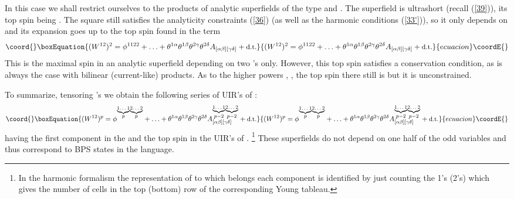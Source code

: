 \documentclass[a4paper,12pt]{article}
\begin{document}
In this case we shall restrict ourselves to the products of 
analytic superfields of the type \coordHE{} and \coordHE{}. The 
superfield \coordHE{} is ultrashort (recall (\ref{39})), its top 
spin being \coordHE{}. The square \coordHE{} still satisfies the 
analyticity constraints (\ref{36}) (as well as the harmonic 
conditions (\ref{33'})), so it only depends on 
\coordHE{} and its expansion goes up to the top spin 
\coordHE{} found in the term 
\begin{equation}\coord{}\boxEquation{\label{56}
 (W^{12})^2 = \phi^{1122} + \ldots 
+ \theta^{1\alpha}\theta^{1\beta}\theta^{2\gamma}\theta^{2\delta} 
A_{[\alpha\beta][\gamma\delta]} + \mbox{\small d.t.} 
}{(W^{12})^2 = \phi^{1122} + \ldots 
+ \theta^{1\alpha}\theta^{1\beta}\theta^{2\gamma}\theta^{2\delta} 
A_{[\alpha\beta][\gamma\delta]} + \mbox{\small d.t.} 
}{ecuacion}\coordE{}\end{equation}
This is the maximal spin in an analytic \coordHE{} superfield 
depending on two \myHighlight{$\theta$}\coordHE{}'s only. However, this top spin satisfies 
a conservation condition, as is always the case with bilinear 
(current-like) products. As to the higher powers \coordHE{}, 
\coordHE{}, the top spin there still is \coordHE{} but it is 
unconstrained. 

To summarize, tensoring \coordHE{}'s we obtain the following series 
of UIR's of \coordHE{}:
\begin{equation}\coord{}\boxEquation{\label{series1}
  (W^{12})^p = \phi^{\stackrel{\underbrace{\mbox{\scriptsize 1\ldots 1}}}{p}
\stackrel{\underbrace{\mbox{\scriptsize 2\ldots 2}}}{p}} + \ldots 
+  \theta^{1\alpha}\theta^{1\beta}\theta^{2\gamma}\theta^{2\delta} 
A^{\stackrel{\underbrace{\mbox{\scriptsize 1\ldots 1}}}{p-2} 
\stackrel{\underbrace{\mbox{\scriptsize 2\ldots 
2}}}{p-2}}_{[\alpha\beta][\gamma\delta]} + \mbox{\small d.t.} 
}{(W^{12})^p = \phi^{\stackrel{\underbrace{\mbox{\scriptsize 1\ldots 1}}}{p}
\stackrel{\underbrace{\mbox{\scriptsize 2\ldots 2}}}{p}} + \ldots 
+  \theta^{1\alpha}\theta^{1\beta}\theta^{2\gamma}\theta^{2\delta} 
A^{\stackrel{\underbrace{\mbox{\scriptsize 1\ldots 1}}}{p-2} 
\stackrel{\underbrace{\mbox{\scriptsize 2\ldots 
2}}}{p-2}}_{[\alpha\beta][\gamma\delta]} + \mbox{\small d.t.} 
}{ecuacion}\coordE{}\end{equation}
having the first component in the \coordHE{} and the top spin 
\coordHE{} in the \coordHE{} UIR's of \coordHE{}.  
\footnote{In the harmonic formalism the representation of 
\coordHE{} to which belongs each component is identified 
by just counting the 1's (2's) which gives the number of cells in 
the top (bottom) row of the corresponding Young tableau.} These 
superfields do not depend on one half of the odd variables and 
thus correspond to \coordHE{} BPS states in the \coordHE{} language. 
\end{document}

